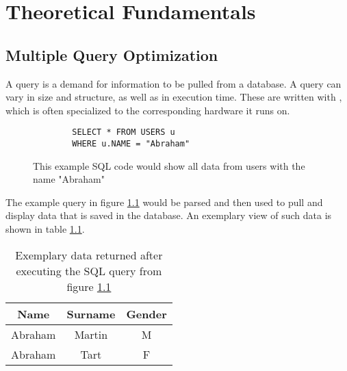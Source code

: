 \chapter{Theoretical Fundamentals} %

\label{chapter:theoretical_fundamentals} %


\section{Multiple Query Optimization}

A query\cite{codd_relational_1970} is a demand for information to be pulled from a database. A query can vary in size and structure, as well as in execution time. These are written with , which is often specialized to the corresponding hardware\cite{shirgoldbird_microsoft_nodate}\cite{the_postgresql_global_development_group_postgresql_2022} it runs on. 

    
\begin{figure}[!h]
    \centering
    \begin{verbatim}
        SELECT * FROM USERS u
        WHERE u.NAME = "Abraham"
    \end{verbatim}
    \caption{This example SQL code would show all data from users with the name "Abraham"}
    \label{fig:sql_query_example}
\end{figure}

The example query in figure \ref{fig:sql_query_example} would be parsed and then used to pull and display data that is saved in the database. An exemplary view of such data is shown in table \ref{table:sql_query_result_example}.

\begin{table}[!h]
    \centering
    \begin{tabular}{|c|c|c|}
        \hline
        Name    & Surname & Gender \\ \hline
        Abraham & Martin  & M      \\ \hline
        Abraham & Tart    & F      \\ \hline
    \end{tabular}
    \caption{Exemplary data returned after executing the SQL query from figure \ref{fig:sql_query_example}}
    \label{table:sql_query_result_example}
\end{table}

